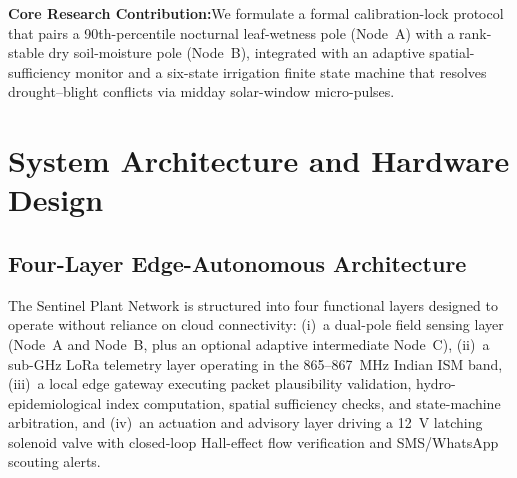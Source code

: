 \documentclass[10pt,twocolumn,a4paper]{article}
\newcommand{\takeaway}[2]{%
  \vspace{4pt}\noindent\colorbox{bgbox}{%
    \parbox{\dimexpr\linewidth-2\fboxsep\relax}{%
      \vspace{2pt}\footnotesize\textbf{\color{primary}#1:}\hspace{0.4em}#2\vspace{2pt}%
    }%
  }\vspace{4pt}%
}
\begin{document}
\takeaway{Core Research Contribution}{We formulate a formal calibration-lock protocol that pairs a 90th-percentile nocturnal leaf-wetness pole (Node~A) with a rank-stable dry soil-moisture pole (Node~B), integrated with an adaptive spatial-sufficiency monitor and a six-state irrigation finite state machine that resolves drought--blight conflicts via midday solar-window micro-pulses.}

\section{System Architecture and Hardware Design}

\subsection{Four-Layer Edge-Autonomous Architecture}

The Sentinel Plant Network is structured into four functional layers designed to operate without reliance on cloud connectivity: (i)~a dual-pole field sensing layer (Node~A and Node~B, plus an optional adaptive intermediate Node~C), (ii)~a sub-GHz LoRa telemetry layer operating in the 865--867~MHz Indian ISM band, (iii)~a local edge gateway executing packet plausibility validation, hydro-epidemiological index computation, spatial sufficiency checks, and state-machine arbitration, and (iv)~an actuation and advisory layer driving a 12~V latching solenoid valve with closed-loop Hall-effect flow verification and SMS/WhatsApp scouting alerts.
\end{document}

